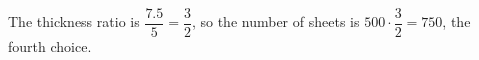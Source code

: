 The thickness ratio is $\dfrac{7.5}{5}=\dfrac{3}{2}$, so the number of sheets is $500\cdot\dfrac{3}{2}=\boxed{750}$, the fourth choice.
